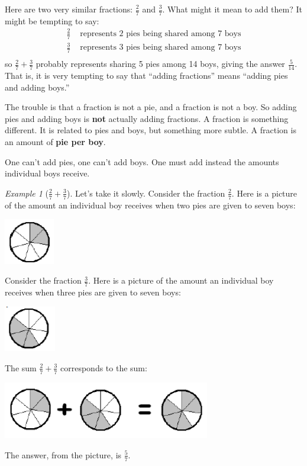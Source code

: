 \documentclass[10pt, reqno]{amsart}
\theoremstyle{remark}
\newtheorem{example}[thm]{Example}
\theoremstyle{definition}
\numberwithin{equation}{section}  %
\begin{document}
Here are two very similar fractions:
$\frac 2 7$ and $\frac 3 7$.
What might it mean to add them?
It might be tempting to say:
\begin{align*}
\frac 2 7 &
\text{ represents 2 pies being shared among 7 boys}\\
\frac 3 7 &
\text{ represents 3 pies being shared among 7 boys}\\
\end{align*}
so
$\frac 2 7 + \frac 3 7$ 
probably represents sharing 5 pies among 14 boys, giving the answer
$\frac 5{14}$.
That is, it is very tempting to say that ``adding fractions'' means  ``adding pies and 
adding boys.''

The trouble is that a fraction is not a pie, and a fraction is not a boy. So adding
pies and adding boys is {\bf not} actually adding fractions. 
A fraction is something
different. It is related to pies and boys, but something more subtle. A fraction is
an amount of {\bf pie per boy}.

One can't add pies, one can't add boys. One must add instead the amounts individual
boys receive.

\begin{example}[$\frac 27 + \frac 37$]
Let's take it slowly.
Consider the fraction $\frac 2 7$.
Here is a picture of the amount an individual boy receives when two pies are given to seven boys:
   \begin{center}
\includegraphics[height = 2cm]{2seventhspie}
\end{center}



Consider the fraction $\frac 3 7$.
Here is a picture of the amount an individual boy receives
when three pies are given to seven boys:
   \begin{center}
\includegraphics[height = 2cm]{3seventhspie}
\end{center}


The sum
$\frac 2 7 + \frac 3 7 $
corresponds to the sum:

   \begin{center}
\includegraphics[height = 2.5cm]{addseventhspie}
\end{center}



The answer, from the picture, is $\frac 5 7$.
\end{example}
\end{document}
